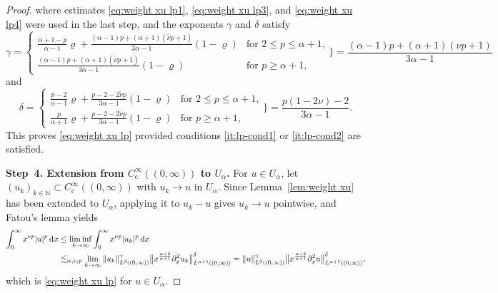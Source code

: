 \documentclass[reqno,12pt]{amsart}
\renewcommand{\d}{\ensuremath{\mathrm{d}}}
\newcommand{\N}{\ensuremath{\mathbb{N}}}
\renewcommand{\d}{\ensuremath{{\rm d}}}
\numberwithin{equation}{section}
\begin{document}
\begin{proof}
 where estimates \eqref{eq:weight xu lp1}, \eqref{eq:weight xu lp3}, and \eqref{eq:weight xu lp4} were used in the last step, and the exponents \(\gamma\) and \(\delta\) satisfy
\begin{equation*}
 \gamma = \begin{cases}\frac{\alpha+1-p}{\alpha-1} \varrho + \frac{(\alpha-1) p + (\alpha+1) (\tilde\nu p + 1)}{3\alpha-1} (1-\varrho) & \text{for $2 \leq p \leq \alpha +1$,} \\[0.2cm]
 \frac{(\alpha-1) p + (\alpha+1) (\tilde\nu p + 1)}{3\alpha-1} (1-\varrho) & \text{for $p \geq \alpha +1$,} \end{cases} \Bigg\} = \frac{(\alpha -1)p + (\alpha +1)(\nu p +1)}{3\alpha -1} 
 \end{equation*}
 and
 \begin{equation*}
 \delta = \begin{cases}\frac{p-2}{\alpha-1} \varrho + \frac{p-2-2\tilde{\nu} p}{3\alpha-1} (1-\varrho) & \text{for $2 \leq p \leq \alpha +1$,} \\[0.2cm]
 \frac{p}{\alpha+1} \varrho + \frac{p-2-2\tilde{\nu} p}{3\alpha-1} (1-\varrho) & \text{for $p \geq \alpha +1$,} \end{cases} \Bigg\} = \frac{p(1-2\nu) -2}{3\alpha -1}.
 \end{equation*}
 This proves \eqref{eq:weight xu lp} provided conditions \eqref{it:lp-cond1} or \eqref{it:lp-cond2} are satisfied.

%
\bigskip
%

 \noindent\textbf{Step~4. Extension from $C^\infty_\mathrm{c}((0,\infty))$ to $U_\alpha$.}
 For $u \in U_\alpha$, let $(u_k)_{k \in \N} \subset C^\infty_\mathrm{c}((0,\infty))$
 with $u_k \to u$ in $U_\alpha$. Since Lemma~\ref{lem:weight xu} has been
 extended to $U_\alpha$, applying it to $u_k - u$ gives $u_k \to u$ pointwise,
 and Fatou's lemma yields
 \begin{align*}
 \int_0^\infty x^{\nu p} |u|^p \, \d x
 &\leq \liminf_{k \to \infty} \int_0^\infty x^{\nu p} |u_k|^p \, \d x
 \\
 &\lesssim_{\alpha,\nu,p} 
 \lim_{k \to \infty} \|u_k\|_{L^2((0,\infty))}^{\gamma}
 \big\|x^{\frac{\alpha+2}{\alpha+1}} \partial_x^2 u_k\big\|_{L^{\alpha+1}((0,\infty))}^{\delta}
 = \|u\|_{L^2((0,\infty))}^{\gamma}
 \big\|x^{\frac{\alpha+2}{\alpha+1}} \partial_x^2 u\big\|_{L^{\alpha+1}((0,\infty))}^{\delta},   
 \end{align*}
 which is \eqref{eq:weight xu lp} for $u \in U_\alpha$.
\end{proof}
%
\end{document}
